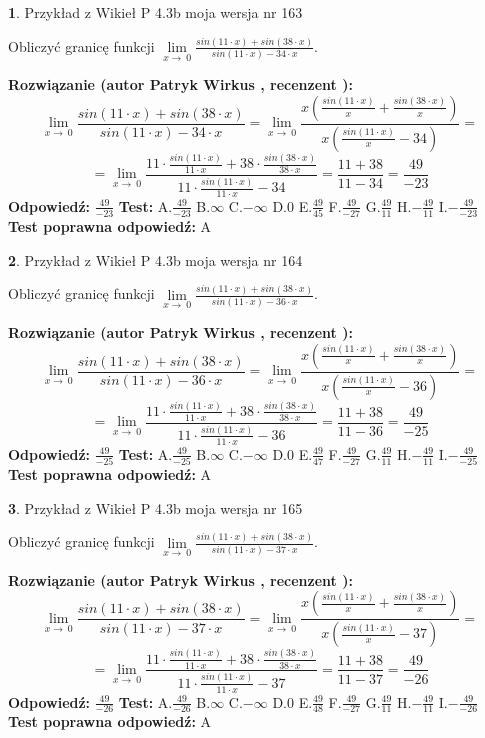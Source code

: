 \documentclass[12pt, a4paper]{article}
\theoremstyle{definition} %
\newtheorem{zad}{}
\newcommand{\zadStart}[1]{\begin{zad}#1\newline}
\newcommand{\zadStop}{\end{zad}}
\newcommand{\rozwStart}[2]{\noindent \textbf{Rozwiązanie (autor #1 , recenzent #2): }\newline}
\newcommand{\rozwStop}{\newline}
\newcommand{\odpStart}{\noindent \textbf{Odpowiedź:}\newline}
\newcommand{\odpStop}{\newline}
\newcommand{\testStart}{\noindent \textbf{Test:}\newline}
\newcommand{\testStop}{\newline}
\newcommand{\kluczStart}{\noindent \textbf{Test poprawna odpowiedź:}\newline}
\newcommand{\kluczStop}{\newline}
\begin{document}
\zadStart{Przykład z Wikieł P 4.3b moja wersja nr 163}


Obliczyć granicę funkcji $\lim\limits_{x\to\ 0}\frac{sin(11 \cdot x)+sin(38 \cdot x)}{sin(11 \cdot x)-34 \cdot x}$.
\zadStop
\rozwStart{Patryk Wirkus}{}
$$\lim\limits_{x\to\ 0}\frac{sin(11 \cdot x)+sin(38 \cdot x)}{sin(11 \cdot x)-34 \cdot x}=\lim\limits_{x\to\ 0}\frac{x(\frac{sin(11 \cdot x)}{x}+\frac{sin(38 \cdot x)}{x})}{x(\frac{sin(11 \cdot x)}{x}-34)}=$$
$$=\lim\limits_{x\to\ 0}\frac{11 \cdot \frac{sin(11 \cdot x)}{11 \cdot x}+38 \cdot \frac{sin(38 \cdot x)}{38 \cdot x}}{11 \cdot \frac{sin(11 \cdot x)}{11 \cdot x}-34}=\frac{11+38}{11-34} = \frac{49}{-23}$$
\rozwStop
\odpStart
$\frac{49}{-23}$
\odpStop
\testStart
A.$\frac{49}{-23}$
B.$\infty$
C.$-\infty$
D.$0$
E.$\frac{49}{45}$
F.$\frac{49}{-27}$
G.$\frac{49}{11}$
H.$-\frac{49}{11}$
I.$-\frac{49}{-23}$
\testStop
\kluczStart
A
\kluczStop



\zadStart{Przykład z Wikieł P 4.3b moja wersja nr 164}


Obliczyć granicę funkcji $\lim\limits_{x\to\ 0}\frac{sin(11 \cdot x)+sin(38 \cdot x)}{sin(11 \cdot x)-36 \cdot x}$.
\zadStop
\rozwStart{Patryk Wirkus}{}
$$\lim\limits_{x\to\ 0}\frac{sin(11 \cdot x)+sin(38 \cdot x)}{sin(11 \cdot x)-36 \cdot x}=\lim\limits_{x\to\ 0}\frac{x(\frac{sin(11 \cdot x)}{x}+\frac{sin(38 \cdot x)}{x})}{x(\frac{sin(11 \cdot x)}{x}-36)}=$$
$$=\lim\limits_{x\to\ 0}\frac{11 \cdot \frac{sin(11 \cdot x)}{11 \cdot x}+38 \cdot \frac{sin(38 \cdot x)}{38 \cdot x}}{11 \cdot \frac{sin(11 \cdot x)}{11 \cdot x}-36}=\frac{11+38}{11-36} = \frac{49}{-25}$$
\rozwStop
\odpStart
$\frac{49}{-25}$
\odpStop
\testStart
A.$\frac{49}{-25}$
B.$\infty$
C.$-\infty$
D.$0$
E.$\frac{49}{47}$
F.$\frac{49}{-27}$
G.$\frac{49}{11}$
H.$-\frac{49}{11}$
I.$-\frac{49}{-25}$
\testStop
\kluczStart
A
\kluczStop



\zadStart{Przykład z Wikieł P 4.3b moja wersja nr 165}


Obliczyć granicę funkcji $\lim\limits_{x\to\ 0}\frac{sin(11 \cdot x)+sin(38 \cdot x)}{sin(11 \cdot x)-37 \cdot x}$.
\zadStop
\rozwStart{Patryk Wirkus}{}
$$\lim\limits_{x\to\ 0}\frac{sin(11 \cdot x)+sin(38 \cdot x)}{sin(11 \cdot x)-37 \cdot x}=\lim\limits_{x\to\ 0}\frac{x(\frac{sin(11 \cdot x)}{x}+\frac{sin(38 \cdot x)}{x})}{x(\frac{sin(11 \cdot x)}{x}-37)}=$$
$$=\lim\limits_{x\to\ 0}\frac{11 \cdot \frac{sin(11 \cdot x)}{11 \cdot x}+38 \cdot \frac{sin(38 \cdot x)}{38 \cdot x}}{11 \cdot \frac{sin(11 \cdot x)}{11 \cdot x}-37}=\frac{11+38}{11-37} = \frac{49}{-26}$$
\rozwStop
\odpStart
$\frac{49}{-26}$
\odpStop
\testStart
A.$\frac{49}{-26}$
B.$\infty$
C.$-\infty$
D.$0$
E.$\frac{49}{48}$
F.$\frac{49}{-27}$
G.$\frac{49}{11}$
H.$-\frac{49}{11}$
I.$-\frac{49}{-26}$
\testStop
\kluczStart
A
\kluczStop
\end{document}

